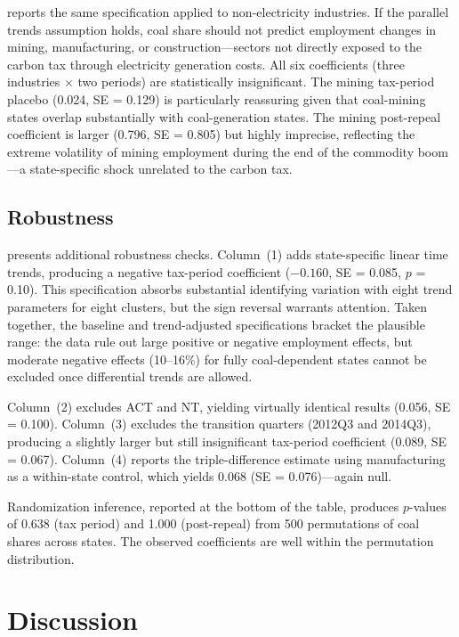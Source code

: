 \documentclass[12pt]{article}
\begin{document}
 reports the same specification applied to non-electricity industries. If the parallel trends assumption holds, coal share should not predict employment changes in mining, manufacturing, or construction---sectors not directly exposed to the carbon tax through electricity generation costs. All six coefficients (three industries $\times$ two periods) are statistically insignificant. The mining tax-period placebo (0.024, SE = 0.129) is particularly reassuring given that coal-mining states overlap substantially with coal-generation states. The mining post-repeal coefficient is larger (0.796, SE = 0.805) but highly imprecise, reflecting the extreme volatility of mining employment during the end of the commodity boom---a state-specific shock unrelated to the carbon tax.



\subsection{Robustness}

 presents additional robustness checks. Column~(1) adds state-specific linear time trends, producing a negative tax-period coefficient ($-0.160$, SE = 0.085, $p$ = 0.10). This specification absorbs substantial identifying variation with eight trend parameters for eight clusters, but the sign reversal warrants attention. Taken together, the baseline and trend-adjusted specifications bracket the plausible range: the data rule out large positive or negative employment effects, but moderate negative effects (10--16\%) for fully coal-dependent states cannot be excluded once differential trends are allowed.

Column~(2) excludes ACT and NT, yielding virtually identical results (0.056, SE = 0.100). Column~(3) excludes the transition quarters (2012Q3 and 2014Q3), producing a slightly larger but still insignificant tax-period coefficient (0.089, SE = 0.067). Column~(4) reports the triple-difference estimate using manufacturing as a within-state control, which yields 0.068 (SE = 0.076)---again null.

Randomization inference, reported at the bottom of the table, produces $p$-values of 0.638 (tax period) and 1.000 (post-repeal) from 500 permutations of coal shares across states. The observed coefficients are well within the permutation distribution.




\section{Discussion}
\end{document}
